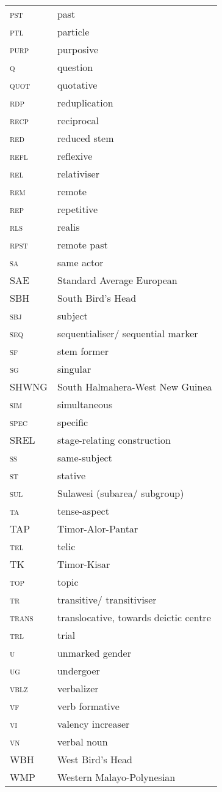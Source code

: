 \begin{longtable}{l l}
 \textsc{pst}  & past \\
 \textsc{ptl}  & particle \\
 \textsc{purp}  & purposive \\
 \textsc{q}  & question \\
 \textsc{quot}  & quotative \\
 \textsc{rdp}  & reduplication \\
 \textsc{recp}  & reciprocal \\
 \textsc{red}  & reduced stem \\
 \textsc{refl}  & reflexive \\
 \textsc{rel}  & relativiser \\
 \textsc{rem}  & remote \\
 \textsc{rep}  & repetitive \\
 \textsc{rls}  & realis \\
 \textsc{rpst}  & remote past \\
 \textsc{sa}  & same actor \\
 \textsc{SAE}  & Standard Average European \\
 \textsc{SBH}  & South Bird's Head \\
 \textsc{sbj}  & subject \\
 \textsc{seq}  & sequentialiser/ sequential marker \\
 \textsc{sf}  & stem former \\
 \textsc{sg}  & singular \\
 \textsc{SHWNG}  & South Halmahera-West New Guinea \\
 \textsc{sim}  & simultaneous \\
 \textsc{spec}  & specific \\
 \textsc{SREL}  & stage-relating construction \\
 \textsc{ss}  & same-subject \\
 \textsc{st}  & stative \\
 \textsc{sul}  & Sulawesi (subarea/ subgroup) \\
 \textsc{ta}  & tense-aspect \\
 \textsc{TAP}  & Timor-Alor-Pantar \\
 \textsc{tel}  & telic \\
 \textsc{TK}  & Timor-Kisar \\
 \textsc{top}  & topic \\
 \textsc{tr}  & transitive/ transitiviser \\
 \textsc{trans}  & translocative, towards deictic centre \\
 \textsc{trl}  & trial \\
 \textsc{u}  & unmarked gender \\
 \textsc{ug}  & undergoer \\
 \textsc{vblz}  & verbalizer \\
 \textsc{vf}  & verb formative \\
 \textsc{vi}  & valency increaser \\
 \textsc{vn}  & verbal noun \\
 \textsc{WBH}  & West Bird's Head \\
 \textsc{WMP}  & Western Malayo-Polynesian \\
\end{longtable}